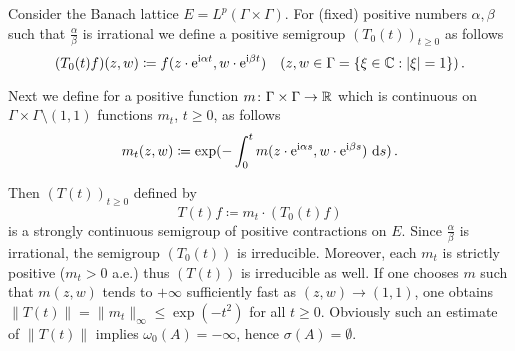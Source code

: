 \begin{example}\label{ex:c3-3.6}

Consider the Banach lattice $E = L^{p}(\Gamma\times\Gamma)$.
For (fixed) positive numbers $\alpha,\beta$ such that $\frac{\alpha}{\beta}$ is irrational we define a positive semigroup $(T_{0}(t))_{t\geq 0}$ as follows
\begin{equation}\label{eq:c3-3.9}
	(T_{0}(t)f)(z,w) \coloneqq f(z\cdot \mathrm{e}^{\mathrm{i}\alpha t},w\cdot \mathrm{e}^{\mathrm{i}\beta t}) \quad (z,w \in \Gamma = \{\xi\in\mathbb{C} :|\xi|=1\})\,.
\end{equation}

Next we define for a positive function $m \colon \Gamma\times\Gamma \to \mathbb{R} $ which is continuous on $\Gamma\times\Gamma\setminus(1,1)$ functions $m_{t}$, $t\geq 0$, as follows
\begin{equation}\label{eq:c3-3.10}
	m_{t}(z,w) \coloneqq \exp(-\int_{0}^{t} m(z\cdot \mathrm{e}^{\mathrm{i}\alpha s},w\cdot \mathrm{e}^{\mathrm{i}\beta s})\,\mathop{}\!\mathrm{d}{s})\,.
\end{equation}

Then $(T(t))_{t\geq 0}$ defined by
\begin{equation}\label{eq:c3-3.11}
	T(t)f \coloneqq m_{t}\cdot(T_{0}(t)f)
\end{equation}
is a strongly continuous semigroup of positive contractions on $E$.
Since $\frac{\alpha}{\beta}$ is irrational, the semigroup $(T_{0}(t))$ is irreducible.
Moreover, each $m_{t}$ is strictly positive (\ie  $m_{t} > 0$ a.e.) thus $(T(t))$ is irreducible as well.
If one chooses $m$ such that $m(z,w)$ tends to $+\infty$ sufficiently fast as $(z,w) \to (1,1)$, one obtains $\|T(t)\| = \|m_{t}\|_{\infty} \leq \exp(-t^{2})$ for all $t \geq 0$.
Obviously such an estimate of $\|T(t)\|$ implies $\omega_0(A) = -\infty$, hence $\sigma(A) = \emptyset$.
\end{example}

